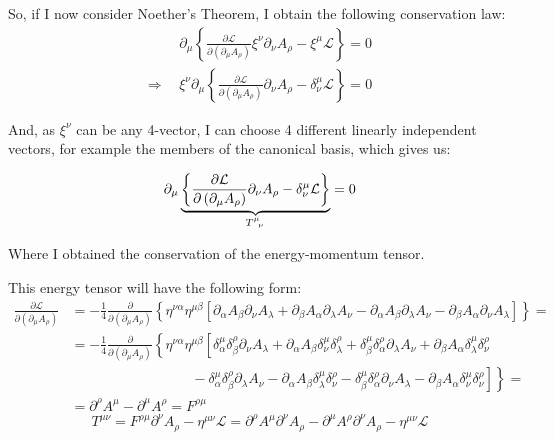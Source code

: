 \documentclass[12pt]{article}
\begin{document}
So, if I now consider Noether's Theorem, I obtain the following conservation law:
\begin{align*}
    &\partial_\mu \left\{ \frac{\partial\mathcal{L}}{\partial \left( \partial_\mu A_\rho \right)} \xi^\nu \partial_\nu A_\rho - \xi^\mu\mathcal{L} \right\} = 0
    \\ \Longrightarrow ~~ &\xi^\nu \partial_\mu \left\{ \frac{\partial\mathcal{L}}{\partial \left( \partial_\mu A_\rho \right)} \partial_\nu A_\rho - \delta^\mu_\nu \mathcal{L} \right\} = 0
\end{align*}

And, as \(\xi^\nu\) can be any 4-vector, I can choose 4 different linearly independent vectors, for example the members of the canonical basis, which gives us:

\[ \partial_\mu \underbrace{ \left\{ \frac{\partial\mathcal{L}}{\partial \left( \partial_\mu A_\rho \right)} \partial_\nu A_\rho - \delta^\mu_\nu \mathcal{L}  \right\} }_{\tensor{T}{^\mu_\nu}}= 0 \]

Where I obtained the conservation of the energy-momentum tensor.

\vspace{0.25cm}

This energy tensor will have the following form:
\begin{align*}
    \frac{ \partial \mathcal{L} }{ \partial \left( \partial_\mu A_\rho \right) } &= -\frac{ 1 }{ 4 } \frac{ \partial }{ \partial \left( \partial_\mu A_\rho \right) }\left\{ \eta^{\nu\alpha} \eta^{\mu\beta} \left[ \partial_\alpha A_\beta \partial_\nu A_\lambda + \partial_\beta A_\alpha \partial_\lambda A_\nu - \partial_\alpha A_\beta \partial_\lambda A_\nu - \partial_\beta A_\alpha \partial_\nu A_\lambda \right] \right\} = \\
    &= -\frac{ 1 }{ 4 } \frac{ \partial }{ \partial \left( \partial_\mu A_\rho \right) }\left\{ \eta^{\nu\alpha} \eta^{\mu\beta} \left[ \delta^\mu_\alpha \delta^\rho_\beta \partial_\nu A_\lambda + \partial_\alpha A_\beta \delta^\mu_\nu \delta^\rho_\lambda + \delta^\mu_\beta \delta^\rho_\alpha \partial_\lambda A_\nu + \partial_\beta A_\alpha \delta^\mu_\lambda \delta^\rho_\nu \right.\right. \\
    &~~~~~~~~~~~~~~~~~~~~~~~~~~~~~~~~~~~~~~~ - \left.\left. \delta^\mu_\alpha \delta^\rho_\beta \partial_\lambda A_\nu - \partial_\alpha A_\beta \delta^\mu_\lambda \delta^\rho_\nu- \delta^\mu_\beta \delta^\rho_\alpha \partial_\nu A_\lambda - \partial_\beta A_\alpha \delta^\mu_\nu \delta^\rho_\nu \right]\right\} = \\
    &= \partial^\rho A^\mu - \partial^\mu A^\rho = F^{\rho\mu}
\end{align*}
\[T^{\mu\nu} = F^{\rho\mu} \partial^\nu A_\rho - \eta^{\mu\nu} \mathcal{L} = \partial^\rho A^\mu \partial^\nu A_\rho - \partial^\mu A^\rho \partial^\nu A_\rho -\eta^{\mu\nu} \mathcal{L}\]
\end{document}
